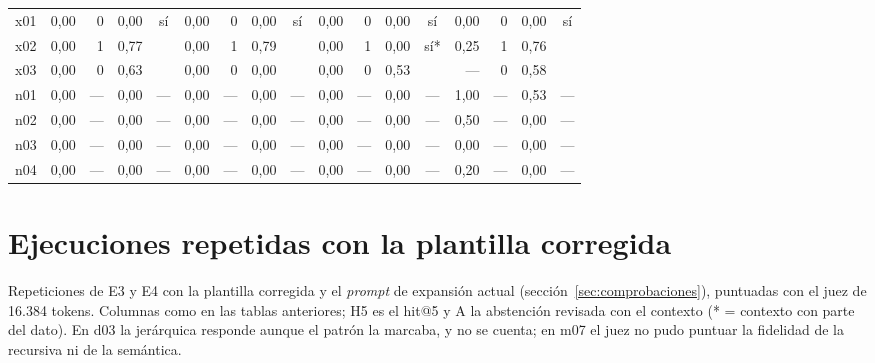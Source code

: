 \begin{scriptsize}
\begin{longtable}{@{}l rrrc rrrc rrrc rrrc@{}}
x01 & 0,00 & 0 & 0,00 & sí & 0,00 & 0 & 0,00 & sí & 0,00 & 0 & 0,00 & sí & 0,00 & 0 & 0,00 & sí \\
x02 & 0,00 & 1 & 0,77 &  & 0,00 & 1 & 0,79 &  & 0,00 & 1 & 0,00 & sí* & 0,25 & 1 & 0,76 &  \\
x03 & 0,00 & 0 & 0,63 &  & 0,00 & 0 & 0,00 &  & 0,00 & 0 & 0,53 &  & --- & 0 & 0,58 &  \\
n01 & 0,00 & --- & 0,00 & --- & 0,00 & --- & 0,00 & --- & 0,00 & --- & 0,00 & --- & 1,00 & --- & 0,53 & --- \\
n02 & 0,00 & --- & 0,00 & --- & 0,00 & --- & 0,00 & --- & 0,00 & --- & 0,00 & --- & 0,50 & --- & 0,00 & --- \\
n03 & 0,00 & --- & 0,00 & --- & 0,00 & --- & 0,00 & --- & 0,00 & --- & 0,00 & --- & 0,00 & --- & 0,00 & --- \\
n04 & 0,00 & --- & 0,00 & --- & 0,00 & --- & 0,00 & --- & 0,00 & --- & 0,00 & --- & 0,20 & --- & 0,00 & --- \\
\bottomrule
\end{longtable}
\end{scriptsize}
\section{Ejecuciones repetidas con la plantilla corregida}
\label{sec:ap-repeticion}

Repeticiones de E3 y E4 con la plantilla corregida y el \emph{prompt} de expansión actual (sección~\ref{sec:comprobaciones}), puntuadas con el juez de 16.384 tokens. Columnas como en las tablas anteriores; H5 es el hit@5 y A la abstención revisada con el contexto (* = contexto con parte del dato). En d03 la jerárquica responde aunque el patrón la marcaba, y no se cuenta; en m07 el juez no pudo puntuar la fidelidad de la recursiva ni de la semántica.


